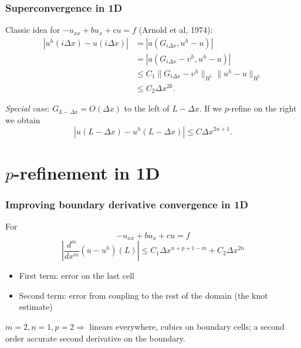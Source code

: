\documentclass[8pt]{beamer}
\begin{document}
\begin{frame}
    \frametitle{Superconvergence in 1D}
    Classic idea for \(-u_{xx} + b u_x + c u = f\) (Arnold et al, 1974):
    \pause
    \begin{align*}
        |u^h(i \Delta x) - u(i \Delta x)|
        &= |a(G_{i\Delta x}, u^h - u)|                                        \\
        &= |a(G_{i\Delta x} - v^h, u^h - u)|                                  \\
        &\leq C_1 \|G_{i\Delta x} - v^h\|_{H^1} \|u^h - u\|_{H^1}             \\
        &\leq C_2 \Delta x^{2 k}.
    \end{align*}

    \pause
    \emph{Special case}: \(G_{L - \Delta x} = O(\Delta x)\) to the left of \(L -
    \Delta x\). If we \(p\)-refine on the right we obtain
    \begin{equation*}
        |u(L - \Delta x) - u^h(L - \Delta x)| \leq C \Delta x^{2 n + 1}.
    \end{equation*}
\end{frame}

\section{\(p\)-refinement in 1D}
\begin{frame}
    \frametitle{Improving boundary derivative convergence in 1D}
    For
    \begin{equation*}
        -u_{xx} + b u_x + c u = f
    \end{equation*}
    \pause
    \begin{equation*}
        \left|\dfrac{d^m}{dx^m}(u - u^h)(L)\right|
        \leq C_1 \Delta x^{n + p + 1 - m}
        + C_2 \Delta x^{2 n}
    \end{equation*}
    \pause
    \begin{itemize}
        \item First term: error on the last cell
        \item Second term: error from coupling to the rest of the domain (the
              knot estimate)
    \end{itemize}
    \pause
    \begin{center}
        \(m = 2, n = 1, p = 2 \Rightarrow\) linears everywhere, cubics on
        boundary cells; a second order accurate second derivative on the
        boundary.
    \end{center}
\end{frame}
\end{document}
